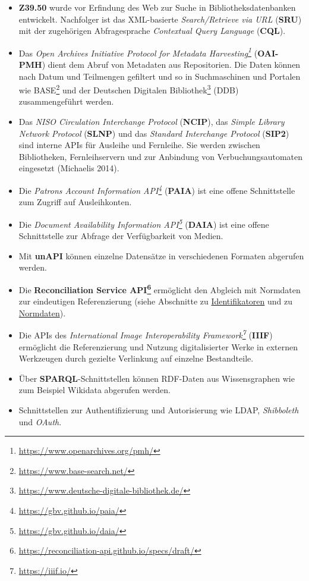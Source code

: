 \documentclass[
  11pt,
  letterpaper,
  DIV=11,
  twoside]{scrreprt}
\DeclareRobustCommand{\href}[2]{#2\footnote{\url{#1}}}
\begin{document}
\begin{itemize}
\item
  \textbf{Z39.50} wurde vor Erfindung des Web zur Suche in
  Bibliotheksdatenbanken entwickelt. Nachfolger ist das XML-basierte
  \emph{Search/Retrieve via URL} (\textbf{SRU}) mit der zugehörigen
  Abfragesprache \emph{Contextual Query Language} (\textbf{CQL}).
\item
  Das \emph{\href{https://www.openarchives.org/pmh/}{Open Archives
  Initiative Protocol for Metadata Harvesting}} (\textbf{OAI-PMH}) dient
  dem Abruf von Metadaten aus Repositorien. Die Daten können nach Datum
  und Teilmengen gefiltert und so in Suchmaschinen und Portalen wie
  \href{https://www.base-search.net/}{BASE} und der
  \href{https://www.deutsche-digitale-bibliothek.de/}{Deutschen
  Digitalen Bibliothek} (DDB) zusammengeführt werden.
\item
  Das \emph{NISO Circulation Interchange Protocol} (\textbf{NCIP}), das
  \emph{Simple Library Network Protocol} (\textbf{SLNP}) und das
  \emph{Standard Interchange Protocol} (\textbf{SIP2}) sind interne APIs
  für Ausleihe und Fernleihe. Sie werden zwischen Bibliotheken,
  Fernleihservern und zur Anbindung von Verbuchungsautomaten eingesetzt
  (Michaelis 2014).
\item
  Die \emph{\href{https://gbv.github.io/paia/}{Patrons Account
  Information API}} (\textbf{PAIA}) ist eine offene Schnittstelle zum
  Zugriff auf Ausleihkonten.
\item
  Die \emph{\href{https://gbv.github.io/daia/}{Document Availability
  Information API}} (\textbf{DAIA}) ist eine offene Schnittstelle zur
  Abfrage der Verfügbarkeit von Medien.
\item
  Mit \textbf{unAPI} können einzelne Datensätze in verschiedenen
  Formaten abgerufen werden.
\item
  Die
  \textbf{\href{https://reconciliation-api.github.io/specs/draft/}{Reconciliation
  Service API}} ermöglicht den Abgleich mit Normdaten zur eindeutigen
  Referenzierung (siehe Abschnitte zu
  \hyperref[identifikatoren]{Identifikatoren} und zu
  \hyperref[normdaten]{Normdaten}).
\item
  Die APIs des \emph{\href{https://iiif.io/}{International Image
  Interoperability Framework}} (\textbf{IIIF}) ermöglicht die
  Referenzierung und Nutzung digitalisierter Werke in externen
  Werkzeugen durch gezielte Verlinkung auf einzelne Bestandteile.
\item
  Über \textbf{SPARQL}-Schnittstellen können RDF-Daten aus
  Wissensgraphen wie zum Beispiel Wikidata abgerufen werden.
\item
  Schnittstellen zur Authentifizierung und Autorisierung wie {LDAP},
  \emph{Shibboleth} und \emph{OAuth}.
\end{itemize}
\end{document}
